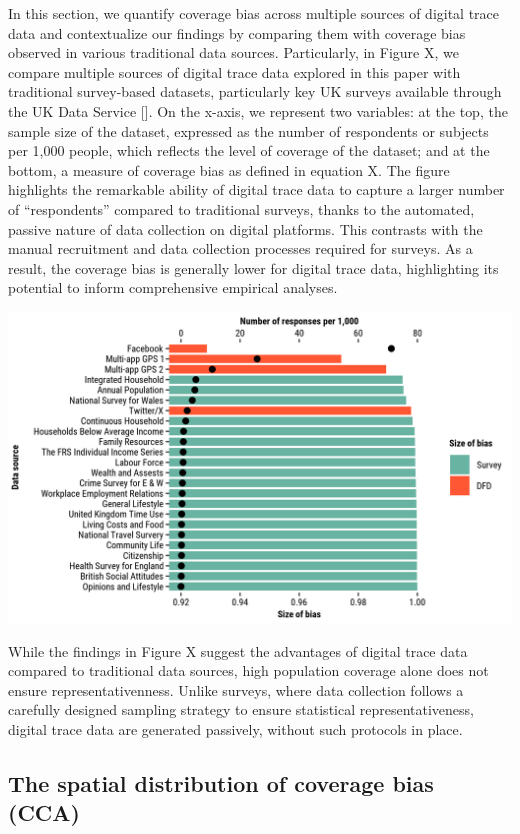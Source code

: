 \documentclass[]{rsos}%
\begin{document}
In this section, we quantify coverage bias across multiple sources of
digital trace data and contextualize our findings by comparing them with
coverage bias observed in various traditional data sources.
Particularly, in Figure X, we compare multiple sources of digital trace
data explored in this paper with traditional survey-based datasets,
particularly key UK surveys available through the UK Data Service {[}{]}. On
the x-axis, we represent two variables: at the top, the sample size of
the dataset, expressed as the number of respondents or subjects per
1,000 people, which reflects the level of coverage of the dataset; and
at the bottom, a measure of coverage bias as defined in equation X. The
figure highlights the remarkable ability of digital trace data to
capture a larger number of ``respondents'' compared to traditional
surveys, thanks to the automated, passive nature of data collection on
digital platforms. This contrasts with the manual recruitment and data
collection processes required for surveys. As a result, the coverage
bias is generally lower for digital trace data, highlighting its
potential to inform comprehensive empirical analyses.

\includegraphics{figures/compare-surveys-two-axis.png}

While the findings in Figure X suggest the advantages of digital trace
data compared to traditional data sources, high population coverage
alone does not ensure representativenness. Unlike surveys, where data
collection follows a carefully designed sampling strategy to ensure
statistical representativeness, digital trace data are generated
passively, without such protocols in place.

\hypertarget{the-spatial-distribution-of-coverage-bias-cca}{%
\subsection{The spatial distribution of coverage bias (CCA)}\label{the-spatial-distribution-of-coverage-bias-cca}}
\end{document}
